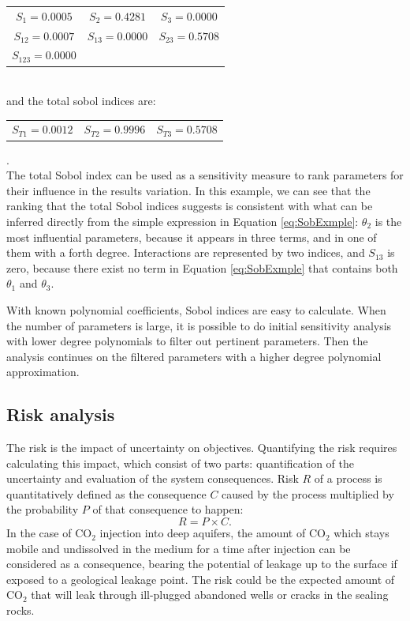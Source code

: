 \begin{tabular}{ccc}
$S_1=0.0005$ & $S_2=0.4281$ & $S_3=0.0000$ \\%
$S_{12}=0.0007$ &  $S_{13}=0.0000$ & $S_{23}=0.5708$\\ %
$S_{123}=0.0000$ & & %
\end{tabular}\\
and the total sobol indices are:\\
\begin{tabular}{ccc}
$S_{T1}= 0.0012$ & $S_{T2}= 0.9996$ & $S_{T3}= 0.5708$ 
\end{tabular}.\\ The total Sobol index can be used as a sensitivity
measure to rank parameters
for their influence in the results variation. In this example, we can see that
the ranking that the total Sobol indices suggests is consistent with what can
be inferred directly from the simple expression in Equation \ref{eq:SobExmple}:
$\theta_2$ is the most influential parameters, because it appears in three terms,
and in one of them with a forth degree. Interactions are represented by two
indices, and $S_{13}$ is zero, because there exist no term in Equation
\ref{eq:SobExmple} that contains both $\theta_1$ and $\theta_3$.

With known polynomial coefficients, Sobol indices are easy to calculate. When
the number of parameters is large, it is possible to do initial sensitivity
analysis with lower degree polynomials to filter out pertinent parameters. Then
the analysis continues on the filtered parameters with a higher
degree polynomial approximation.

\subsection{Risk analysis}
\label{Section:RA}

The risk is the impact of uncertainty on objectives. Quantifying the risk
requires calculating this impact, which consist of two parts: quantification of
the uncertainty and evaluation of the system consequences. Risk $R$ of a process
is quantitatively defined as the consequence $C$
caused by the process multiplied by the probability $P$ of that consequence to
happen:
%
\begin{equation}
R=P\times C
\label{eq:rsk}.\end{equation}
%
In the case of $\mbox{CO}_{2}$ injection into deep aquifers, the amount of
$\mbox{CO}_{2}$ which stays mobile and undissolved in the medium for a time
after injection can be considered as a consequence, bearing the potential of
leakage up to the surface if exposed to a geological leakage point. The risk
could be the expected amount of $\mbox{CO}_{2}$ that will leak through
ill-plugged abandoned wells or cracks in the sealing rocks. 

